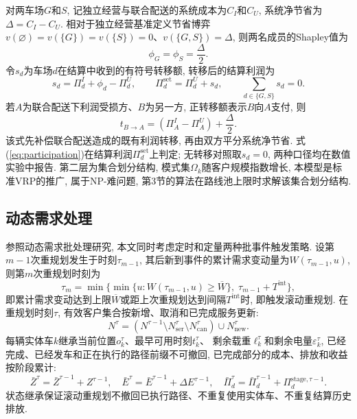 \documentclass{setp-new}
\begin{document}
对两车场$G$和$S$, 记独立经营与联合配送的系统成本为$C_I$和$C_U$,
系统净节省为$\Delta=C_I-C_U$.
相对于独立经营基准定义节省博弈
$v(\varnothing)=v(\{G\})=v(\{S\})=0$、$v(\{G,S\})=\Delta$,
则两名成员的Shapley值为
\[
\phi_G=\phi_S=\frac{\Delta}{2}.
\]
令$s_d$为车场$d$在结算中收到的有符号转移额, 转移后的结算利润为
\[
s_d=\Pi_d^I+\phi_d-\Pi_d^U,\qquad
\Pi_d^{\mathrm{set}}=\Pi_d^U+s_d,\qquad
\sum_{d\in\{G,S\}}s_d=0.
\]
若$A$为联合配送下利润受损方、$B$为另一方, 正转移额表示$B$向$A$支付, 则
\[
t_{B\to A}=(\Pi_A^I-\Pi_A^U)+\frac{\Delta}{2}.
\]
该式先补偿联合配送造成的既有利润转移, 再由双方平分系统净节省.
式(\ref{eq:participation})在结算利润$\Pi_d^{\mathrm{set}}$上判定;
无转移对照取$s_d=0$, 两种口径均在数值实验中报告.
第二层为集合划分结构, 模式集$\Omega_k$随客户规模指数增长,
本模型是标准VRP的推广, 属于NP-难问题, 第3节的算法在路线池上限时求解该集合划分结构.

\subsection{动态需求处理}

参照动态需求批处理研究\cite{ref:18,ref:71},
本文同时考虑定时和定量两种批事件触发策略.
设第$m-1$次重规划发生于时刻$\tau_{m-1}$,
其后新到事件的累计需求变动量为$W(\tau_{m-1},u)$,
则第$m$次重规划时刻为
\begin{equation}
\tau_m=\min\bigl\{\min\{u:W(\tau_{m-1},u)\ge\overline W\},\;\tau_{m-1}+T^{\mathrm{int}}\bigr\},
\label{eq:trigger}
\end{equation}
即累计需求变动达到上限$\overline W$或距上次重规划达到间隔$T^{\mathrm{int}}$时, 即触发滚动重规划.
在重规划时刻$\tau$, 有效客户集合按新增、取消和已完成服务更新:
\begin{equation}
N^\tau=(N^{\tau-1}\setminus N_{\mathrm{ser}}^\tau\setminus N_{\mathrm{can}}^\tau)\cup N_{\mathrm{new}}^\tau.
\label{eq:customer_update}
\end{equation}
每辆实体车$k$继承当前位置$o_k^\tau$、最早可用时刻$t_k^\tau$、
剩余载重$\ell_k^\tau$和剩余电量$\varepsilon_k^\tau$,
已经完成、已经发车和正在执行的路径前缀不可撤回,
已完成部分的成本、排放和收益按阶段累计:
\begin{equation}
\bar Z^\tau=\bar Z^{\tau-1}+Z^{\tau-1},\quad
\bar E^\tau=\bar E^{\tau-1}+\Delta E^{\tau-1},\quad
\bar\Pi_d^\tau=\bar\Pi_d^{\tau-1}+\Pi_d^{\mathrm{stage},\tau-1}.
\label{eq:accumulation}
\end{equation}
状态继承保证滚动重规划不撤回已执行路径、不重复使用实体车、不重复结算历史排放.

\end{document}
